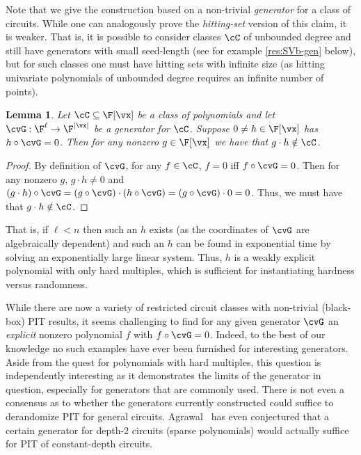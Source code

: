 \documentclass[11pt]{article}
\numberwithin{equation}{section}
\newtheorem{lemma}[theorem]{Lemma}
\theoremstyle{definition}
\theoremstyle{plain}
\begin{document}
%



Note that we give the construction based on a non-trivial \emph{generator} for a class of circuits. While one can analogously prove the \emph{hitting-set} version of this claim, it is weaker.  That is, it is possible to consider classes $\cC$ of unbounded degree and still have generators with small seed-length (see for example \autoref{res:SVb-gen} below), but for such classes one must have hitting sets with infinite size (as hitting univariate polynomials of unbounded degree requires an infinite number of points).

\begin{lemma}\label{res:generator_to_lbs-mult}
        Let $\cC\subseteq\F[\vx]$ be a class of polynomials and let $\cvG:\F^\ell\to\F^{|\vx|}$ be a generator for $\cC$.  Suppose $0\ne h\in\F[\vx]$ has $h\circ \cvG=0$.  Then for any nonzero $g\in\F[\vx]$ we have that $g\cdot h\notin \cC$.
\end{lemma}
\begin{proof}
        By definition of $\cvG$, for any $f\in\cC$, $f=0$ iff $f\circ \cvG=0$.  Then for any nonzero $g$, $g\cdot h\ne 0$ and $(g\cdot h)\circ \cvG=(g\circ \cvG)\cdot (h\circ \cvG)=(g\circ \cvG) \cdot 0=0$.  Thus, we must have that $g\cdot h\notin\cC$.
\end{proof}

That is, if $\ell<n$ then such an $h$ exists (as the coordinates of $\cvG$ are algebraically dependent) and such an $h$ can be found in exponential time by solving an %
exponentially large
linear system.  Thus, $h$ is a %
weakly explicit %
polynomial with only hard multiples, which is sufficient for instantiating hardness versus randomness.

While there are now a variety of restricted circuit classes with non-trivial (black-box) PIT results, it seems challenging to find for any given generator $\cvG$ an \emph{explicit} nonzero polynomial $f$ with $f\circ \cvG=0$.  Indeed, to the best of our knowledge no such examples have ever been furnished for interesting generators. Aside from the quest for polynomials with hard multiples, this question is independently interesting as it demonstrates the limits of the generator in question, especially for generators that are commonly used.  There is not even a consensus as to whether the generators currently constructed could suffice to derandomize PIT for general circuits. Agrawal~\cite{Agrawal05} has even conjectured that a certain generator for depth-2 circuits (sparse polynomials) would actually suffice for PIT of constant-depth circuits.
\end{document}

